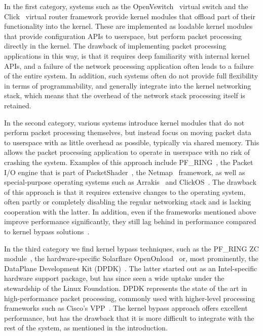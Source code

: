 \documentclass[sigconf]{acmart}
\begin{document}
In the first category, systems such as the OpenVswitch~\cite{openvswitch}
virtual switch and the Click~\cite{morris1999click} virtual router framework
provide kernel modules that offload part of their functionality into the kernel.
These are implemented as loadable kernel modules that provide configuration APIs
to userspace, but perform packet processing directly in the kernel. The
drawback of implementing packet processing applications in this way, is that it
requires deep familiarity with internal kernel APIs, and a failure of the
network processing application often leads to a failure of the entire system. In
addition, such systems often do not provide full flexibility in terms of
programmability, and generally integrate into the kernel networking stack,
which means that the overhead of the network stack processing itself is
retained.

In the second category, various systems introduce kernel modules that do not
perform packet processing themselves, but instead focus on moving packet data to
userspace with as little overhead as possible, typically via shared memory. This
allows the packet processing application to operate in userspace with no risk of
crashing the system. Examples of this approach include
PF\_RING~\cite{deri2009modern}, the Packet I/O engine that is part of
PacketShader~\cite{han2010packetshader}, the Netmap~\cite{rizzo2012netmap}
framework, as well as special-purpose operating systems such as
Arrakis~\cite{peter2016arrakis} and ClickOS~\cite{martins2014clickos}. The
drawback of this approach is that it requires extensive changes to the operating
system, often partly or completely disabling the regular networking stack and
is lacking cooperation with the latter. In addition, even if the frameworks
mentioned above improve performance significantly, they still lag behind in
performance compared to kernel bypass solutions~\cite{gallenmuller_comparison_2015}.

In the third category we find kernel bypass techniques, such as the PF\_RING ZC
module~\cite{pfringzc}, the hardware-specific Solarflare
OpenOnload~\cite{openonload} or, most prominently, the DataPlane Development Kit
(DPDK)~\cite{dpdk}. The latter started out as an Intel-specific hardware support
package, but has since seen a wide uptake under the stewardship of the Linux
Foundation. DPDK represents the state of the art in high-performance packet
processing, commonly used with higher-level processing frameworks such as
Cisco's VPP~\cite{linguaglossa2017high}. The kernel bypass approach offers
excellent performance, but has the drawback that it is more difficult to
integrate with the rest of the system, as mentioned in the introduction.
\end{document}
